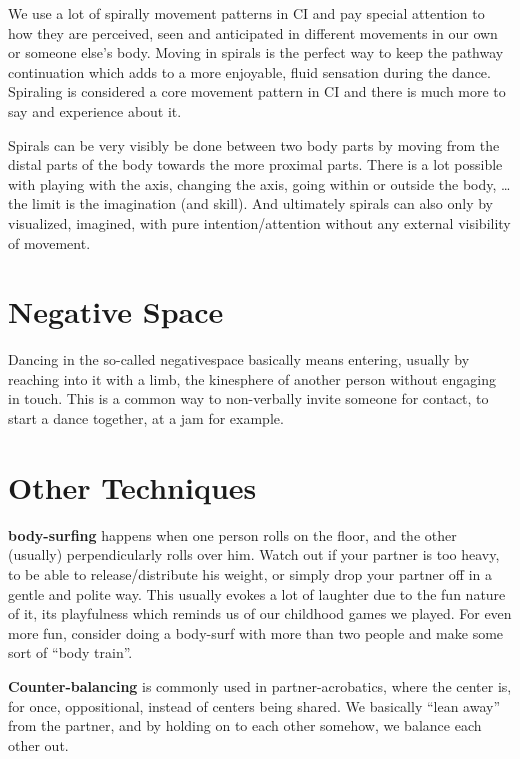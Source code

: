We use a lot of spirally movement patterns in CI and pay special attention to how they are perceived, seen and anticipated in different movements in our own or someone else's body.
Moving in spirals is the perfect way to keep the pathway continuation which adds to a more enjoyable, fluid sensation during the dance.
Spiraling is considered a core movement pattern in CI and there is much more to say and experience about it.

Spirals can be very visibly be done between two body parts by moving from the distal parts of the body towards the more proximal parts.
There is a lot possible with playing with the axis, changing the axis, going within or outside the body, \ldots the limit is the imagination (and skill).
And ultimately spirals can also only by visualized, imagined, with pure intention/attention without any external visibility of movement.

\section{Negative Space}\label{sec:negative-space}

Dancing in the so-called \gls{negativespace} basically means entering, usually by reaching into it with a limb, the \gls{kinesphere} of another person without engaging in touch.
This is a common way to non-verbally invite someone for contact, to start a dance together, at a jam for example.

\section{Other Techniques}\label{sec:other-techniques}

\textbf{\Gls{body-surfing}} happens when one person rolls on the floor, and the other (usually) perpendicularly rolls over him.
Watch out if your partner is too heavy, to be able to release/distribute his weight, or simply drop your partner off in a gentle and polite way.
This usually evokes a lot of laughter due to the fun nature of it, its playfulness which reminds us of our childhood games we played.
For even more fun, consider doing a body-surf with more than two people and make some sort of ``body train''.

\textbf{Counter-balancing} is commonly used in partner-acrobatics, where the center is, for once, oppositional, instead of centers being shared.
We basically ``lean away'' from the partner, and by holding on to each other somehow, we balance each other out.
